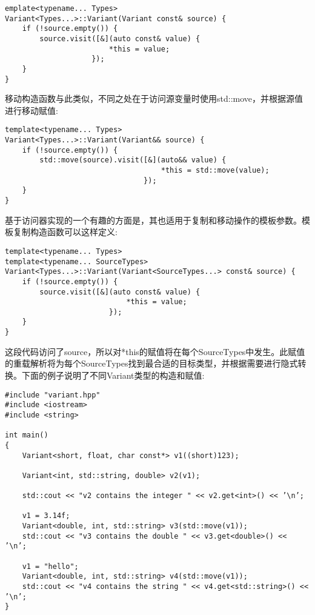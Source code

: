 \begin{lstlisting}[style=styleCXX]
emplate<typename... Types>
Variant<Types...>::Variant(Variant const& source) {
	if (!source.empty()) {
		source.visit([&](auto const& value) {
						*this = value;
					});
	}
}
\end{lstlisting}

移动构造函数与此类似，不同之处在于访问源变量时使用std::move，并根据源值进行移动赋值:

\begin{lstlisting}[style=styleCXX]
template<typename... Types>
Variant<Types...>::Variant(Variant&& source) {
	if (!source.empty()) {
		std::move(source).visit([&](auto&& value) {
									*this = std::move(value);
								});
	}
}
\end{lstlisting}

基于访问器实现的一个有趣的方面是，其也适用于复制和移动操作的模板参数。模板复制构造函数可以这样定义:

\begin{lstlisting}[style=styleCXX]
template<typename... Types>
template<typename... SourceTypes>
Variant<Types...>::Variant(Variant<SourceTypes...> const& source) {
	if (!source.empty()) {
		source.visit([&](auto const& value) {
							*this = value;
						});
	}
}
\end{lstlisting}

这段代码访问了source，所以对*this的赋值将在每个SourceTypes中发生。此赋值的重载解析将为每个SourceTypes找到最合适的目标类型，并根据需要进行隐式转换。下面的例子说明了不同Variant类型的构造和赋值:

\begin{lstlisting}[style=styleCXX]
#include "variant.hpp"
#include <iostream>
#include <string>

int main()
{
	Variant<short, float, char const*> v1((short)123);
	
	Variant<int, std::string, double> v2(v1);
	
	std::cout << "v2 contains the integer " << v2.get<int>() << ’\n’;
	
	v1 = 3.14f;
	Variant<double, int, std::string> v3(std::move(v1));
	std::cout << "v3 contains the double " << v3.get<double>() << ’\n’;
	
	v1 = "hello";
	Variant<double, int, std::string> v4(std::move(v1));
	std::cout << "v4 contains the string " << v4.get<std::string>() << ’\n’;
}
\end{lstlisting}

